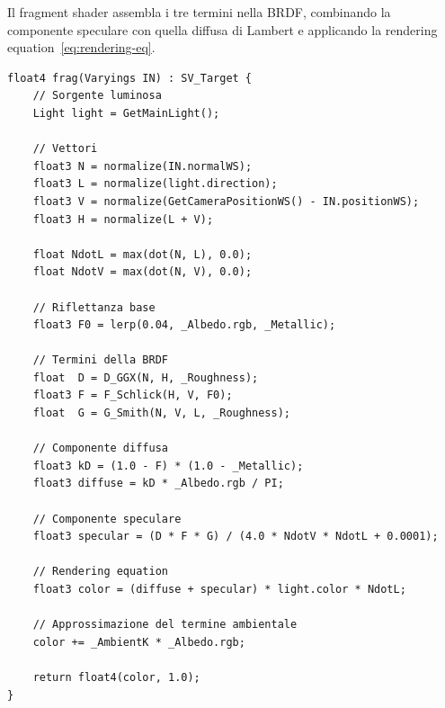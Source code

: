 \documentclass[12pt,a4paper,twoside]{book}
\begin{document}
\begin{minipage}{\textwidth}

Il fragment shader assembla i tre termini nella BRDF, combinando la componente speculare con quella diffusa di Lambert e applicando la rendering equation~\eqref{eq:rendering-eq}.

\begin{lstlisting}[style=hlsl,
    caption={Fragment shader del modello di Cook-Torrance.},
    label={lst:frag-pbr}]
float4 frag(Varyings IN) : SV_Target {
    // Sorgente luminosa
    Light light = GetMainLight();
    
    // Vettori
    float3 N = normalize(IN.normalWS);
    float3 L = normalize(light.direction);
    float3 V = normalize(GetCameraPositionWS() - IN.positionWS);
    float3 H = normalize(L + V);

    float NdotL = max(dot(N, L), 0.0);
    float NdotV = max(dot(N, V), 0.0);

    // Riflettanza base
    float3 F0 = lerp(0.04, _Albedo.rgb, _Metallic);

    // Termini della BRDF
    float  D = D_GGX(N, H, _Roughness);
    float3 F = F_Schlick(H, V, F0);
    float  G = G_Smith(N, V, L, _Roughness);

    // Componente diffusa
    float3 kD = (1.0 - F) * (1.0 - _Metallic);
    float3 diffuse = kD * _Albedo.rgb / PI;

    // Componente speculare
    float3 specular = (D * F * G) / (4.0 * NdotV * NdotL + 0.0001);

    // Rendering equation
    float3 color = (diffuse + specular) * light.color * NdotL;

    // Approssimazione del termine ambientale
    color += _AmbientK * _Albedo.rgb;

    return float4(color, 1.0);
}
\end{lstlisting}
\end{minipage}
\end{document}
